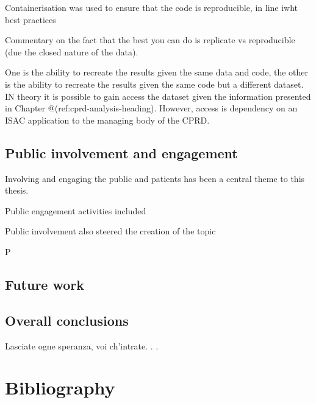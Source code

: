 \documentclass[a4paper, twoside]{templates/ociamthesis}
\begin{document}
Containerisation was used to ensure that the code is reproducible, in line iwht best practices

Commentary on the fact that the best you can do is replicate vs reproducible (due the closed nature of the data).

One is the ability to recreate the results given the same data and code, the other is the ability to recreate the results given the same code but a different dataset. IN theory it is possible to gain access the dataset given the information presented in Chapter @(ref:cprd-analysis-heading). However, access is dependency on an ISAC application to the managing body of the CPRD.

\hypertarget{disc-PPI}{%
\section{Public involvement and engagement}\label{disc-PPI}}

Involving and engaging the public and patients has been a central theme to this thesis.

Public engagement activities included

Public involvement also steered the creation of the topic

P

\hypertarget{future-work}{%
\section{Future work}\label{future-work}}

\hypertarget{overall-conclusions}{%
\section{Overall conclusions}\label{overall-conclusions}}

\begin{savequote}
Lasciate ogne speranza, voi ch'intrate. . .
\end{savequote}

\hypertarget{bibliography}{%
\chapter{Bibliography}\label{bibliography}}
\end{document}
